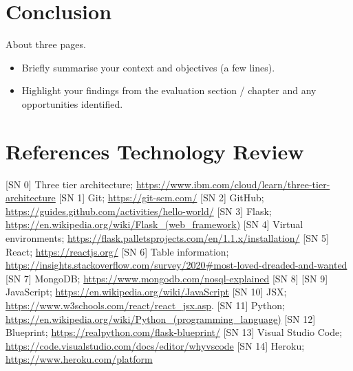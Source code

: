 \chapter{Conclusion}
About three pages.

\begin{itemize}
\item Briefly summarise your context and objectives (a few lines).
\item Highlight your findings from the evaluation section / chapter and any opportunities identified.
\end{itemize}

\chapter{References Technology Review}
[SN 0] Three tier architecture; \url{https://www.ibm.com/cloud/learn/three-tier-architecture}
[SN 1] Git; \url{https://git-scm.com/}
[SN 2] GitHub; \url{https://guides.github.com/activities/hello-world/}
[SN 3] Flask; \url{https://en.wikipedia.org/wiki/Flask_(web_framework)}
[SN 4] Virtual environments; \url{https://flask.palletsprojects.com/en/1.1.x/installation/}
[SN 5] React;  \url{https://reactjs.org/}
[SN 6] Table information; \url{https://insights.stackoverflow.com/survey/2020#most-loved-dreaded-and-wanted}
[SN 7] MongoDB; \url{https://www.mongodb.com/nosql-explained}
[SN 8]
[SN 9] JavaScript; \url{https://en.wikipedia.org/wiki/JavaScript}
[SN 10] JSX; \url{https://www.w3schools.com/react/react_jsx.asp}.
[SN 11] Python; \url{https://en.wikipedia.org/wiki/Python_(programming_language)}
[SN 12] Blueprint; \url{https://realpython.com/flask-blueprint/}
[SN 13] Visual Studio Code; \url{https://code.visualstudio.com/docs/editor/whyvscode}
[SN 14] Heroku; \url{https://www.heroku.com/platform}


